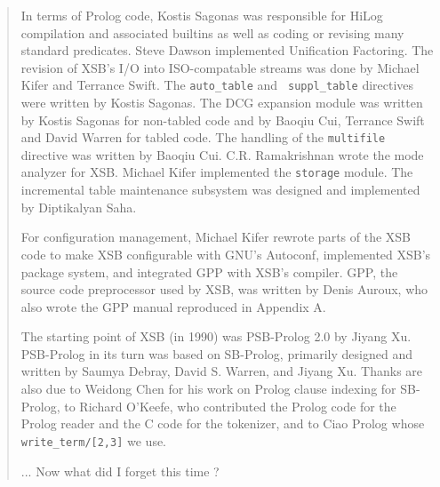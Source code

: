 \begin{quote}
In terms of Prolog code, Kostis Sagonas was responsible for HiLog
compilation and associated builtins as well as coding or revising many
standard predicates.  Steve Dawson implemented Unification Factoring.
The revision of XSB's I/O into ISO-compatable streams was done by
Michael Kifer and Terrance Swift.  The {\tt auto\_table} and {\tt
suppl\_table} directives were written by Kostis Sagonas.  The DCG
expansion module was written by Kostis Sagonas for non-tabled code and
by Baoqiu Cui, Terrance Swift and David Warren for tabled code.  The
handling of the {\tt multifile} directive was written by Baoqiu
Cui. C.R. Ramakrishnan wrote the mode analyzer for XSB.  Michael Kifer
implemented the {\tt storage} module.  The incremental table
maintenance subsystem was designed and implemented by Diptikalyan
Saha.

For configuration management, Michael Kifer rewrote parts of the XSB
code to make XSB configurable with GNU's Autoconf, implemented XSB's
package system, and integrated GPP with XSB's compiler.  GPP, the
source code preprocessor used by XSB, was written by Denis Auroux, who
also wrote the GPP manual reproduced in Appendix A.

The starting point of XSB (in 1990) was PSB-Prolog 2.0 by Jiyang Xu.
PSB-Prolog in its turn was based on SB-Prolog, primarily designed and
written by Saumya Debray, David S. Warren, and Jiyang Xu.  Thanks are
also due to Weidong Chen for his work on Prolog clause indexing for
SB-Prolog, to Richard O'Keefe, who contributed the Prolog code for the
Prolog reader and the C code for the tokenizer, and to Ciao Prolog
whose {\tt write\_term/[2,3]} we use.

... Now what did I forget this time ?

\end{quote}

